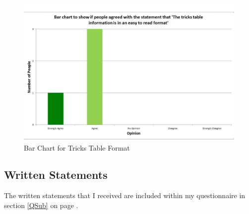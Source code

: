 \begin{figure}[H]
    \includegraphics[width=\textwidth]{./Evaluation/images/TricksTableGraph.pdf}
    \caption{Bar Chart for Tricks Table Format} \label{fig:TricksTableGraph}
\end{figure}


\subsection{Written Statements}

The written statements that I received are included within my questionnaire in section \ref{QSub} on page \pageref{QSub}.
